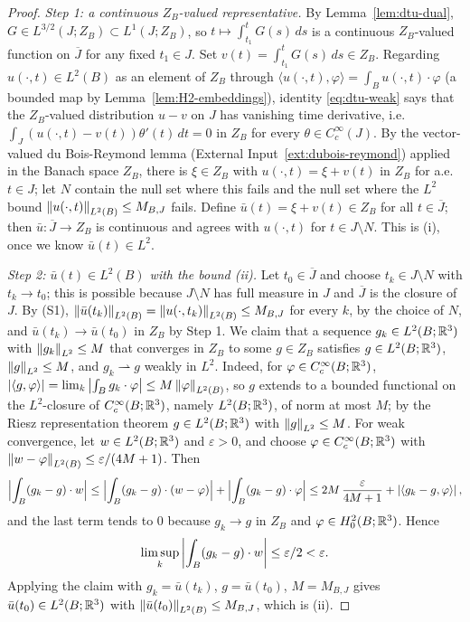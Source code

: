 \documentclass[11pt,reqno]{amsart}
\begin{document}
\begin{proof}
\emph{Step 1: a continuous $Z_{B}$-valued representative.} By
Lemma~\ref{lem:dtu-dual}, $G\in L^{3/2}(J;Z_{B})\subset L^{1}(J;Z_{B})$, so
$t\mapsto\int_{t_{1}}^{t}G(s)\,ds$ is a continuous $Z_{B}$-valued function on
$\overline{J}$ for any fixed $t_{1}\in J$. Set
$v(t)=\int_{t_{1}}^{t}G(s)\,ds\in Z_{B}$. Regarding $u(\cdot,t)\in L^{2}(B)$ as
an element of $Z_{B}$ through $\langle u(\cdot,t),\varphi\rangle
=\int_{B}u(\cdot,t)\cdot\varphi$ (a bounded map by
Lemma~\ref{lem:H2-embeddings}), identity \eqref{eq:dtu-weak} says that the
$Z_{B}$-valued distribution $u-v$ on $J$ has vanishing time derivative, i.e.\
$\int_{J}(u(\cdot,t)-v(t))\theta'(t)\,dt=0$ in $Z_{B}$ for every
$\theta\in C_{c}^{\infty}(J)$. By the vector-valued du Bois-Reymond lemma
(External Input~\ref{ext:dubois-reymond}) applied in the Banach space $Z_{B}$,
there is $\xi\in Z_{B}$ with $u(\cdot,t)=\xi+v(t)$ in $Z_{B}$ for a.e.\ $t\in J$;
let $N$ contain the null set where this fails and the null set where the
$L^{2}$ bound $\left\lVert u(\cdot,t) \right\rVert_{L^{2}(B)}\le M_{B,J}$ fails. Define
$\bar u(t)=\xi+v(t)\in Z_{B}$ for all $t\in\overline{J}$; then
$\bar u:\overline{J}\to Z_{B}$ is continuous and agrees with $u(\cdot,t)$ for
$t\in J\setminus N$. This is (i), once we know $\bar u(t)\in L^{2}$.

\emph{Step 2: $\bar u(t)\in L^{2}(B)$ with the bound (ii).} Let
$t_{0}\in\overline{J}$ and choose $t_{k}\in J\setminus N$ with $t_{k}\to t_{0}$;
this is possible because $J\setminus N$ has full measure in $J$ and
$\overline{J}$ is the closure of $J$. By (S1),
$\left\lVert \bar u(t_{k}) \right\rVert_{L^{2}(B)}=\left\lVert u(\cdot,t_{k}) \right\rVert_{L^{2}(B)}\le M_{B,J}$
for every $k$, by the choice of $N$, and
$\bar u(t_{k})\to\bar u(t_{0})$ in $Z_{B}$ by Step 1. We claim that a sequence
$g_{k}\in L^{2}(B;\mathbb{R}^{3})$ with $\left\lVert g_{k} \right\rVert_{L^{2}}\le M$ that converges in
$Z_{B}$ to some $g\in Z_{B}$ satisfies $g\in L^{2}(B;\mathbb{R}^{3})$,
$\left\lVert g \right\rVert_{L^{2}}\le M$, and $g_{k}\rightharpoonup g$ weakly in $L^{2}$. Indeed,
for $\varphi\in C^{\infty}_{c}(B;\mathbb{R}^{3})$,
$\left\lvert \langle g,\varphi\rangle \right\rvert=\lim_{k}\left\lvert \int_{B}g_{k}\cdot\varphi \right\rvert
\le M\left\lVert \varphi \right\rVert_{L^{2}(B)}$, so $g$ extends to a bounded functional on the
$L^{2}$-closure of $C_{c}^{\infty}(B;\mathbb{R}^{3})$, namely $L^{2}(B;\mathbb{R}^{3})$, of norm
at most $M$; by the Riesz representation theorem $g\in L^{2}(B;\mathbb{R}^{3})$ with
$\left\lVert g \right\rVert_{L^{2}}\le M$. For weak convergence, let $w\in L^{2}(B;\mathbb{R}^{3})$ and
$\varepsilon>0$, and choose $\varphi\in C_{c}^{\infty}(B;\mathbb{R}^{3})$ with
$\left\lVert w-\varphi \right\rVert_{L^{2}(B)}\le\varepsilon/(4M+1)$. Then
\[
  \Bigl|\int_{B}(g_{k}-g)\cdot w\Bigr|
  \le\Bigl|\int_{B}(g_{k}-g)\cdot(w-\varphi)\Bigr|
    +\Bigl|\int_{B}(g_{k}-g)\cdot\varphi\Bigr|
  \le 2M\,\frac{\varepsilon}{4M+1}
    +\left\lvert \langle g_{k}-g,\varphi\rangle \right\rvert ,
\]
and the last term tends to $0$ because $g_{k}\to g$ in $Z_{B}$ and
$\varphi\in H^{2}_{0}(B;\mathbb{R}^{3})$. Hence
\[
\limsup_{k}\left\lvert \int_{B}(g_{k}-g)\cdot w \right\rvert\le\varepsilon/2<\varepsilon
.
\]
Applying the claim with $g_{k}=\bar u(t_{k})$, $g=\bar u(t_{0})$, $M=M_{B,J}$
gives $\bar u(t_{0})\in L^{2}(B;\mathbb{R}^{3})$ with
$\left\lVert \bar u(t_{0}) \right\rVert_{L^{2}(B)}\le M_{B,J}$, which is (ii).


\end{proof}
\end{document}
